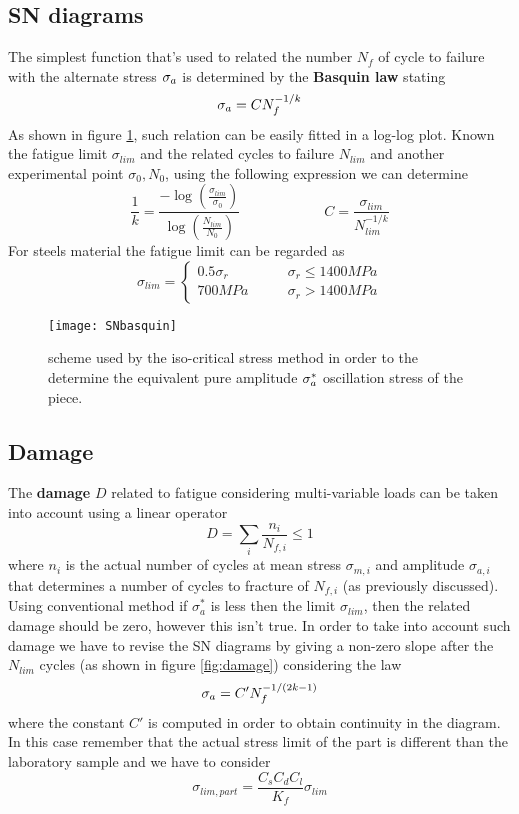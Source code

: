 \subsection{SN diagrams}
	The simplest function that's used to related the number $N_f$ of cycle to failure with the alternate stress $\sigma_{a}$ is determined by the \textbf{Basquin law} stating
	\begin{equation} \label{eq:basquin}
		\sigma_{a} = C N_f^{-1/k}
	\end{equation}
	As shown in figure \ref{fig:basquin}, such relation can be easily fitted in a log-log plot. Known the fatigue limit $\sigma_{lim}$ and the related cycles to failure $N_{lim}$ and another experimental point $\sigma_0,N_0$, using the following expression we can determine
	\begin{equation}
		\frac 1 k = \frac{-\log \left( \frac{\sigma_{lim}}{\sigma_0} \right)}{\log\left( \frac{N_{lim}}{N_0} \right)} \qquad \qquad \qquad C = \frac{\sigma_{lim}}{N_{lim}^{-1/k}}
	\end{equation}
	For steels material the fatigue limit can be regarded as
	\[ \sigma_{lim} = \begin{cases}
		0.5 \sigma_r \qquad &\sigma_r \leq 1400 MPa \\ 700 MPa \qquad & \sigma_r > 1400 MPa
	\end{cases} \]
	\begin{SCfigure}[2][bht]
		\centering \texttt{[image: SNbasquin]}
		\caption{scheme used by the iso-critical stress method in order to the determine the equivalent pure amplitude $\sigma_{a}^*$ oscillation stress of the piece.} \label{fig:basquin}
	\end{SCfigure}

\subsection{Damage}
	The \textbf{damage} $D$ related to fatigue considering multi-variable loads can be taken into account using a linear operator 
	\begin{equation}
		D = \sum_i \frac{n_i}{N_{f,i}} \leq 1
	\end{equation}
	where $n_i$ is the actual number of cycles at mean stress $\sigma_{m,i}$ and amplitude $\sigma_{a,i}$ that determines a number of cycles to fracture of $N_{f,i}$ (as previously discussed). Using conventional method if $\sigma_a^*$ is less then the limit $\sigma_{lim}$, then the related damage should be zero, however this isn't true. In order to take into account such damage we have to revise the SN diagrams by giving a non-zero slope after the $N_{lim}$ cycles (as shown in figure \ref{fig:damage}) considering the law
	\[ \sigma_{a} = C' N_f^{-1/(2k-1)} \]
	where the constant $C'$ is computed in order to obtain continuity in the diagram. In this case remember that the actual stress limit of the part is different than the laboratory sample and we have to consider
	\begin{equation}
		\sigma_{lim,part} = \frac{C_sC_dC_l}{K_f}\sigma_{lim}
	\end{equation}
	
